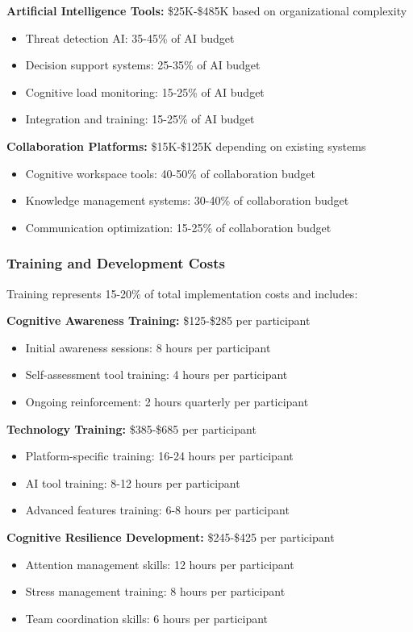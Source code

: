 \documentclass[11pt,a4paper]{article}
\begin{document}
\textbf{Artificial Intelligence Tools:} \$25K-\$485K based on organizational complexity
\begin{itemize}
\item Threat detection AI: 35-45\% of AI budget
\item Decision support systems: 25-35\% of AI budget
\item Cognitive load monitoring: 15-25\% of AI budget
\item Integration and training: 15-25\% of AI budget
\end{itemize}

\textbf{Collaboration Platforms:} \$15K-\$125K depending on existing systems
\begin{itemize}
\item Cognitive workspace tools: 40-50\% of collaboration budget
\item Knowledge management systems: 30-40\% of collaboration budget
\item Communication optimization: 15-25\% of collaboration budget
\end{itemize}

\subsubsection{Training and Development Costs}

Training represents 15-20\% of total implementation costs and includes:

\textbf{Cognitive Awareness Training:} \$125-\$285 per participant
\begin{itemize}
\item Initial awareness sessions: 8 hours per participant
\item Self-assessment tool training: 4 hours per participant
\item Ongoing reinforcement: 2 hours quarterly per participant
\end{itemize}

\textbf{Technology Training:} \$385-\$685 per participant
\begin{itemize}
\item Platform-specific training: 16-24 hours per participant
\item AI tool training: 8-12 hours per participant
\item Advanced features training: 6-8 hours per participant
\end{itemize}

\textbf{Cognitive Resilience Development:} \$245-\$425 per participant
\begin{itemize}
\item Attention management skills: 12 hours per participant
\item Stress management training: 8 hours per participant
\item Team coordination skills: 6 hours per participant
\end{itemize}
\end{document}
